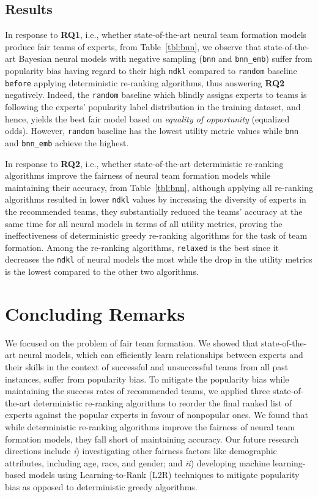 \documentclass[runningheads]{llncs}
\begin{document}
\subsection{Results}
In response to \textbf{RQ1}, i.e., whether state-of-the-art neural team formation models produce fair teams of experts, from Table~\ref{tbl:bnn}, we observe that state-of-the-art Bayesian neural models with negative sampling (\texttt{bnn} and \texttt{bnn\_emb}) suffer from popularity bias having regard to their high \texttt{ndkl} compared to \texttt{random} baseline \texttt{before} applying deterministic re-ranking algorithms, thus answering \textbf{RQ2} negatively. Indeed, the \texttt{random} baseline which blindly assigns experts to teams is following the experts' popularity label distribution in the training dataset, and hence, yields the best fair model based on \textit{equality of opportunity} (equalized odds). However, \texttt{random} baseline has the lowest utility metric values while \texttt{bnn} and \texttt{bnn\_emb} achieve the highest. 

In response to \textbf{RQ2}, i.e., whether state-of-the-art deterministic re-ranking algorithms improve the fairness of neural team formation models while maintaining their accuracy, from Table~\ref{tbl:bnn}, although applying all re-ranking algorithms resulted in lower \texttt{ndkl} values by increasing the diversity of experts in the recommended teams, they substantially reduced the teams' accuracy at the same time for all neural models in terms of all utility metrics, proving the ineffectiveness of deterministic greedy re-ranking algorithms for the task of team formation. Among the re-ranking algorithms, \texttt{relaxed} is the best since it decreases the \texttt{ndkl} of neural models the most while the drop in the utility metrics is the lowest compared to the other two algorithms.

\section{Concluding Remarks}
We focused on the problem of fair team formation. We showed that state-of-the-art neural models, which can efficiently learn relationships between experts and their skills in the context of successful and unsuccessful teams from all past instances, suffer from popularity bias. To mitigate the popularity bias while maintaining the success rates of recommended teams, we applied three state-of-the-art deterministic re-ranking algorithms to reorder the final ranked list of experts against the popular experts in favour of nonpopular ones. We found that while deterministic re-ranking algorithms improve the fairness of neural team formation models, they fall short of maintaining accuracy. Our future research directions include \textit{i}) investigating other fairness factors like demographic attributes, including age, race, and gender; and \textit{ii}) developing machine learning-based models using Learning-to-Rank (L2R) techniques to mitigate popularity bias as opposed to deterministic greedy algorithms.


%
%
%
% 


%
\end{document}
